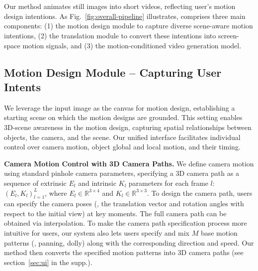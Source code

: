 
\section{\MOCA}
\label{sec-3-method}

Our method animates still images into short videos, reflecting user's motion design intentions. As Fig.~\ref{fig:overall-pipeline} illustrates, 
\MOCA comprises three main components: (1) the motion design module to capture diverse scene-aware motion intentions, (2) the translation module to convert these intentions into screen-space motion signals, and (3) the motion-conditioned video generation model. 


\subsection{Motion Design Module -- Capturing User Intents}
\label{sec-3.1-motion-design}
We leverage the input image as the canvas for motion design, establishing a starting scene on which the motion designs are grounded. This setting enables 3D-scene awareness in the motion design,
capturing spatial relationships between objects, the camera, and the scene. Our unified interface facilitates individual control over camera motion, object global and local motion, and their timing.


\textbf{Camera Motion Control with 3D Camera Paths.}
We define camera motion using standard pinhole camera parameters, specifying a 3D camera path as a sequence of extrinsic $E_l$ and intrinsic $K_l$ parameters for each frame $l$: $(E_l, K_l)_{l=1}^{L}$, where $E_l\in \mathbb{R}^{3\times4}$ and $K_l \in \mathbb{R}^{3\times 3}$.
To design the camera path, users can specify the camera poses (\ie, the translation vector and rotation angles with respect to the initial view) at key moments. The full camera path can be obtained via interpolation.
To make the camera path specification process more intuitive for users, our system also lets users specify and mix $M$ base motion patterns (\eg, panning, dolly) along with the corresponding direction and speed. Our method then converts the specified motion patterns into 3D camera paths (see section~\ref{sec:ui} in the supp.). 



